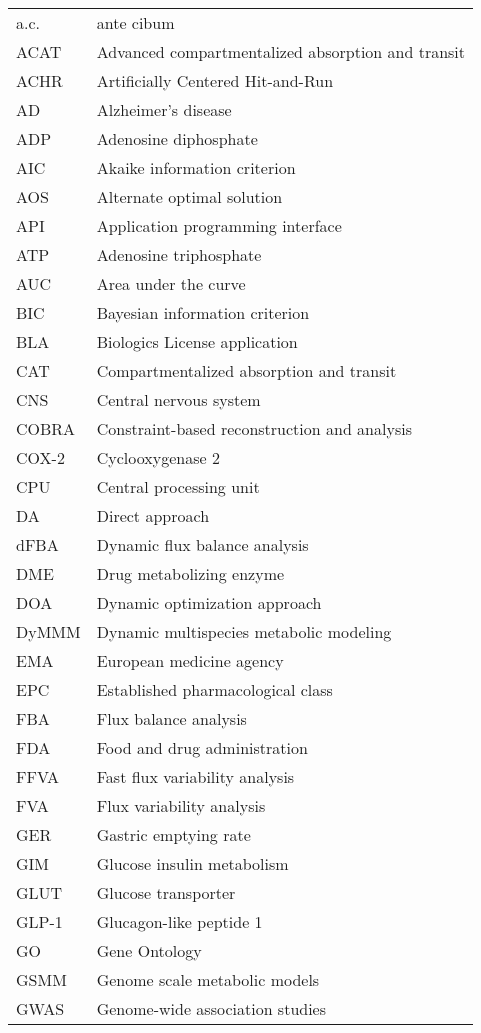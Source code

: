 \begin{table}[h]
	\begin{tabular}{l l} 
	a.c. & ante cibum\\
	ACAT & Advanced compartmentalized absorption and transit\\
	ACHR & Artificially Centered Hit-and-Run\\
	AD & Alzheimer's disease\\
	ADP & Adenosine diphosphate\\
	AIC & Akaike information criterion\\
	AOS & Alternate optimal solution\\
	API & Application programming interface\\
	ATP & Adenosine triphosphate\\
	AUC & Area under the curve\\
	BIC & Bayesian information criterion\\
	BLA & Biologics License application\\
	CAT & Compartmentalized absorption and transit\\
	CNS & Central nervous system\\
	COBRA &	Constraint-based reconstruction and analysis \\
	COX-2 & Cyclooxygenase 2\\
	CPU & Central processing unit\\
	DA & Direct approach\\
	dFBA & Dynamic flux balance analysis\\
	DME & Drug metabolizing enzyme\\
	DOA & Dynamic optimization approach\\
	DyMMM & Dynamic multispecies metabolic modeling \\
	EMA & European medicine agency \\
	EPC & Established pharmacological class\\
	FBA & Flux balance analysis\\
	FDA & Food and drug administration \\
	FFVA & Fast flux variability analysis\\
	FVA & Flux variability analysis\\
	GER & Gastric emptying rate \\
	GIM & Glucose insulin metabolism\\
	GLUT & Glucose transporter\\
	GLP-1 & Glucagon-like peptide 1\\
	GO  & Gene Ontology\\
	GSMM & Genome scale metabolic models\\
	GWAS & Genome-wide association studies \\
		\end{tabular}
\end{table}	
